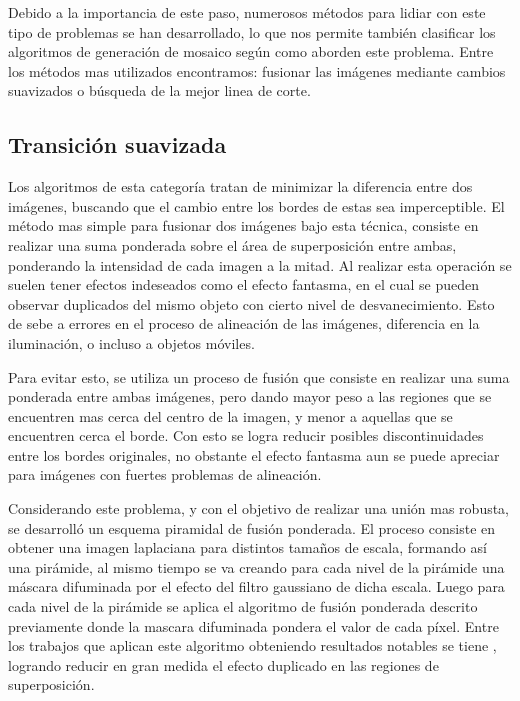 Debido a la importancia de este paso, numerosos métodos para lidiar con este tipo de problemas se han desarrollado, lo que nos permite también clasificar los algoritmos de generación de mosaico según como aborden este problema. Entre los métodos mas utilizados encontramos: fusionar las imágenes mediante cambios suavizados o búsqueda de la mejor linea de corte.

\subsection*{Transición suavizada}

Los algoritmos de esta categoría tratan de minimizar la diferencia entre dos imágenes, buscando que el cambio entre los bordes de estas sea imperceptible. El método mas simple para fusionar dos imágenes bajo esta técnica, consiste en realizar una suma ponderada sobre el área de superposición entre ambas, ponderando la intensidad de cada imagen a la mitad. Al realizar esta operación se suelen tener efectos indeseados como el efecto fantasma, en el cual se pueden observar duplicados del mismo objeto con cierto nivel de desvanecimiento. Esto de sebe a errores en el proceso de alineación de las imágenes, diferencia en la iluminación, o incluso a objetos móviles. 

Para evitar esto, se utiliza un proceso de fusión que consiste en realizar una suma ponderada entre ambas imágenes, pero dando mayor peso a las regiones que se encuentren mas cerca del centro de la imagen, y menor a aquellas que se encuentren cerca el borde. Con esto se logra reducir posibles discontinuidades entre los bordes originales, no obstante el efecto fantasma aun se puede apreciar para imágenes con fuertes problemas de alineación.

Considerando este problema, y con el objetivo de realizar una unión mas robusta, se desarrolló un esquema piramidal de fusión ponderada. El proceso consiste en obtener una imagen laplaciana para distintos tamaños de escala, formando así una pirámide, al mismo tiempo se va creando para cada nivel de la pirámide una máscara difuminada por el efecto del filtro gaussiano de dicha escala. Luego para cada nivel de la pirámide se aplica el algoritmo de fusión ponderada descrito previamente donde la mascara  difuminada pondera el valor de cada píxel. Entre los trabajos que aplican este algoritmo obteniendo resultados notables se tiene \cite{multiband}, logrando reducir en gran medida el efecto duplicado en las regiones de superposición.

